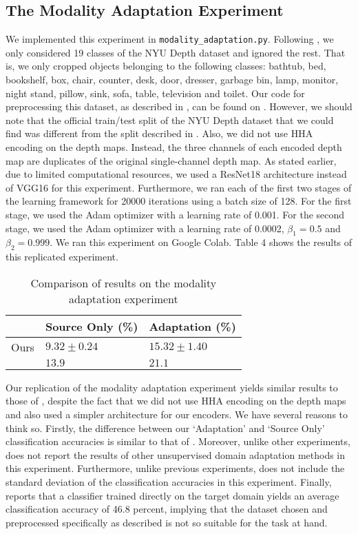 \documentclass[14pt]{extarticle}
\begin{document}
		\subsection{The Modality Adaptation Experiment}
		We implemented this experiment in \texttt{modality\_adaptation.py}. Following \cite{adda}, we only considered 19 classes of the NYU Depth dataset and ignored the rest. That is, we only cropped objects belonging to the following classes: bathtub, bed, bookshelf, box, chair, counter, desk, door, dresser, garbage bin, lamp, monitor, night stand, pillow, sink, sofa, table, television and toilet. Our code for preprocessing this dataset, as described in \cite{adda}, can be found on \cite{nyud2jpg}. However, we should note that the official train/test split of the NYU Depth dataset that we could find \cite{nyud2split} was different from the split described in \cite{adda}. Also, we did not use HHA encoding on the depth maps. Instead, the three channels of each encoded depth map are duplicates of the original single-channel depth map. As stated earlier, due to limited computational resources, we used a ResNet18 architecture instead of VGG16 for this experiment. Furthermore, we ran each of the first two stages of the learning framework for 20000 iterations using a batch size of 128. For the first stage, we used the Adam optimizer with a learning rate of 0.001. For the second stage, we used the Adam optimizer with a learning rate of 0.0002, $\beta_1 = 0.5$ and $\beta_2 = 0.999$. We ran this experiment on Google Colab. Table 4 shows the results of this replicated experiment.
		\begin{table}[H]
			\centering
			\begin{tabular}{|P{40mm}|P{40mm}|P{40mm}|}
				\hline
				 & Source Only (\%) & Adaptation (\%)\\
				\hline
				Ours & $9.32 \pm 0.24$ & $15.32 \pm 1.40$\\
				\hline
				\cite{adda} & $13.9$ & $21.1$\\
				\hline
			\end{tabular}
			\caption{Comparison of results on the modality adaptation experiment}
		\end{table}
		Our replication of the modality adaptation experiment yields similar results to those of \cite{adda}, despite the fact that we did not use HHA encoding on the depth maps and also used a simpler architecture for our encoders. We have several reasons to think so. Firstly, the difference between our `Adaptation' and `Source Only' classification accuracies is similar to that of \cite{adda}. Moreover, unlike other experiments, \cite{adda} does not report the results of other unsupervised domain adaptation methods in this experiment. Furthermore, unlike previous experiments, \cite{adda} does not include the standard deviation of the classification accuracies in this experiment. Finally, \cite{adda} reports that a classifier trained directly on the target domain yields an average classification accuracy of 46.8 percent, implying that the dataset chosen and preprocessed specifically as described is not so suitable for the task at hand.
\end{document}
